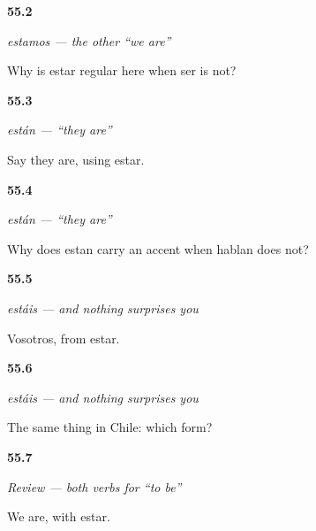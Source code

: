 \noindent\begin{minipage}[t]{\linewidth}
\raggedright
\hypertarget{review-ES-C09-estamos-why}{\textbf{55.2}} \emph{estamos — the other \textquotedblleft{}we are\textquotedblright{}}\par
\small Why is estar regular here when ser is not?
\end{minipage}\par\medskip

\noindent\begin{minipage}[t]{\linewidth}
\raggedright
\hypertarget{review-ES-C09-estan-form}{\textbf{55.3}} \emph{están — \textquotedblleft{}they are\textquotedblright{}}\par
\small Say they are, using estar.
\end{minipage}\par\medskip

\noindent\begin{minipage}[t]{\linewidth}
\raggedright
\hypertarget{review-ES-C09-estan-accent}{\textbf{55.4}} \emph{están — \textquotedblleft{}they are\textquotedblright{}}\par
\small Why does estan carry an accent when hablan does not?
\end{minipage}\par\medskip

\noindent\begin{minipage}[t]{\linewidth}
\raggedright
\hypertarget{review-ES-C09-estais-form}{\textbf{55.5}} \emph{estáis — and nothing surprises you}\par
\small Vosotros, from estar.
\end{minipage}\par\medskip

\noindent\begin{minipage}[t]{\linewidth}
\raggedright
\hypertarget{review-ES-C09-estais-where}{\textbf{55.6}} \emph{estáis — and nothing surprises you}\par
\small The same thing in Chile: which form?
\end{minipage}\par\medskip

\noindent\begin{minipage}[t]{\linewidth}
\raggedright
\hypertarget{review-ES-C09-repaso-ser-estar-we}{\textbf{55.7}} \emph{Review — both verbs for \textquotedblleft{}to be\textquotedblright{}}\par
\small We are, with estar.
\end{minipage}\par\medskip

